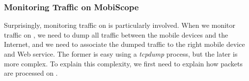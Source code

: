 



\subsubsection{Monitoring Traffic on MobiScope}
\label{sec:monit-traff-mobiscope}

Surprisingly, monitoring traffic on \platname{} is particularly
involved. When we monitor traffic on \platname, we need to dump
all traffic between the mobile devices and the Internet, and we need to
associate the dumped traffic to the right mobile device and Web service. The
former is easy using a \textit{tcpdump} process, but the later is more
complex. To explain this complexity, we first need to explain how
packets are processed on \platname. 


